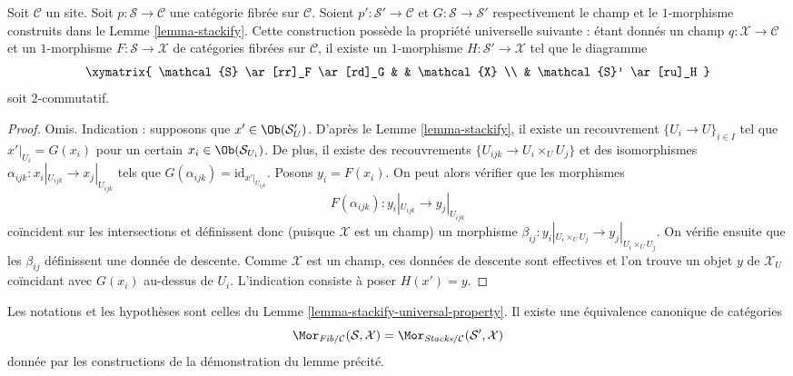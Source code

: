 \begin{lemma}
\label{lemma-stackify-universal-property}
Soit $\mathcal{C}$ un site.
Soit $p : \mathcal{S} \to \mathcal{C}$ une catégorie fibrée sur $\mathcal{C}$.
Soient $p' : \mathcal{S}' \to \mathcal{C}$ et $G : \mathcal{S} \to \mathcal{S}'$
respectivement le champ et le $1$-morphisme construits dans le Lemme \ref{lemma-stackify}.
Cette construction possède la propriété universelle suivante : étant donnés un champ
$q : \mathcal{X} \to \mathcal{C}$ et un $1$-morphisme
$F : \mathcal{S} \to \mathcal{X}$ de catégories fibrées sur $\mathcal{C}$,
il existe un $1$-morphisme $H : \mathcal{S}' \to \mathcal{X}$
tel que le diagramme
$$
\xymatrix{
\mathcal{S} \ar[rr]_F \ar[rd]_G & & \mathcal{X} \\
& \mathcal{S}' \ar[ru]_H
}
$$
soit $2$-commutatif.
\end{lemma}

\begin{proof}
Omis. Indication : supposons que $x' \in \Ob(\mathcal{S}'_U)$.
D'après le Lemme \ref{lemma-stackify},
il existe un recouvrement $\{U_i \to U\}_{i \in I}$
tel que $x'|_{U_i} = G(x_i)$ pour un certain $x_i \in \Ob(\mathcal{S}_{U_i})$.
De plus, il existe des recouvrements $\{U_{ijk} \to U_i \times_U U_j\}$
et des isomorphismes $\alpha_{ijk} : x_i|_{U_{ijk}} \to x_j|_{U_{ijk}}$
tels que $G(\alpha_{ijk}) = \text{id}_{x'|_{U_{ijk}}}$. Posons $y_i = F(x_i)$.
On peut alors vérifier que les morphismes
$$
F(\alpha_{ijk}) : y_i|_{U_{ijk}} \to y_j|_{U_{ijk}}
$$
coïncident sur les intersections et définissent donc (puisque $\mathcal{X}$ est un champ)
un morphisme $\beta_{ij} : y_i|_{U_i \times_U U_j} \to y_j|_{U_i \times_U U_j}$.
On vérifie ensuite que les $\beta_{ij}$ définissent une donnée de descente. Comme
$\mathcal{X}$ est un champ, ces données de descente sont effectives et l'on trouve
un objet $y$ de $\mathcal{X}_U$ coïncidant avec $G(x_i)$ au-dessus de $U_i$.
L'indication consiste à poser $H(x') = y$.
\end{proof}

\begin{lemma}
\label{lemma-stackify-universal-property-more}
Les notations et les hypothèses sont celles du
Lemme \ref{lemma-stackify-universal-property}.
Il existe une équivalence canonique de catégories
$$
\Mor_{\textit{Fib}/\mathcal{C}}(\mathcal{S}, \mathcal{X})
=
\Mor_{\textit{Stacks}/\mathcal{C}}(\mathcal{S}', \mathcal{X})
$$
donnée par les constructions de la démonstration du lemme précité.
\end{lemma}

